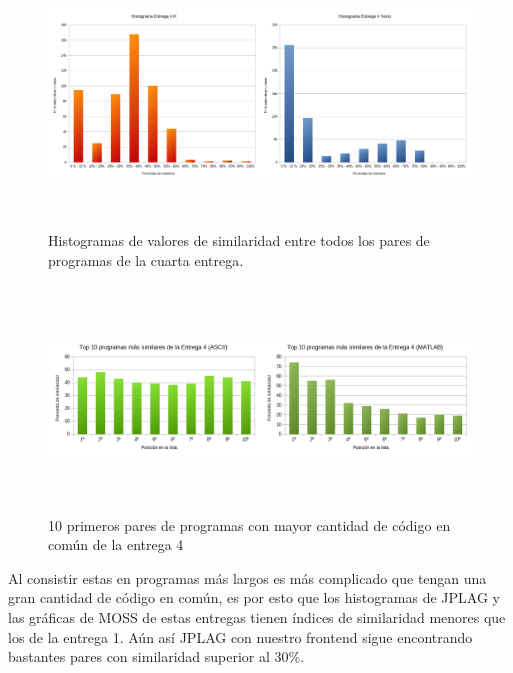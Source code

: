 \begin{figure}[H] %
\centering
\includegraphics[width=15cm, height=7cm]{imagenes/histograma4.png}  %
\caption{Histogramas de valores de similaridad entre todos los pares de programas de la cuarta entrega.} \label{fig:histograma4}
\end{figure}



\begin{figure}[H] %
\centering
\includegraphics[width=14cm, height=6cm]{imagenes/TOP10_4.png}  %
\caption{10 primeros pares de programas con mayor cantidad de código en común de la entrega 4} \label{fig:TOP10_4}
\end{figure}



Al consistir estas en programas más largos es más complicado que tengan una gran cantidad de código en común, es por esto que los histogramas de JPLAG y las gráficas de MOSS de estas entregas tienen índices de similaridad menores que los de la entrega 1.
\newline
Aún así JPLAG con nuestro frontend sigue encontrando bastantes pares con similaridad superior al 30\%. 

